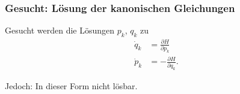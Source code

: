 \begin{frame}
    \frametitle{Gesucht: Lösung der kanonischen Gleichungen}
    
    Gesucht werden die Lösungen $p_k$, $q_k$ zu
    \begin{align*}
        \dot{q}_k &= \frac{\partial H}{\partial p_k} \\
        \dot{p}_k &= -\frac{\partial H}{\partial q_k}.
    \end{align*}
    
    Jedoch: In dieser Form nicht lösbar.
    
\end{frame}